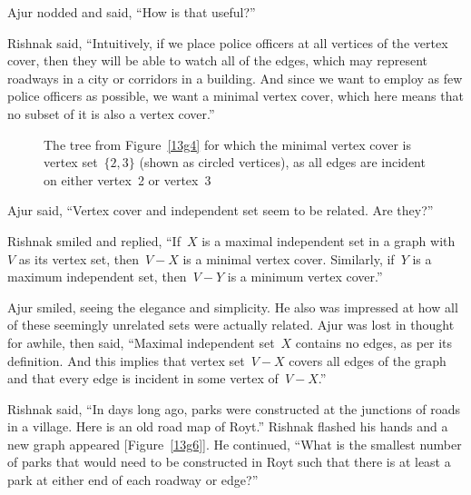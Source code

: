 Ajur nodded and said, ``How is that useful?''

Rishnak said, ``Intuitively, if we place police officers at all vertices of the vertex cover, then they will be able to watch all of the edges, which may represent roadways in a city or corridors in a building. And since we want to employ as few police officers as possible, we want a minimal vertex cover, which here means that no subset of it is also a vertex cover.''

\begin{figure}
\begin{center}

\caption{The tree from Figure~\ref{13g4} for which the minimal vertex cover is vertex set~$\{2,3\}$ (shown as circled vertices), as all edges are incident on either vertex~2 or vertex~3}\label{13g5}
\end{center}
\end{figure}

Ajur said, ``Vertex cover and independent set seem to be related. Are they?''

Rishnak smiled and replied, ``If~$X$ is a maximal independent set in a graph with~$V$ as its vertex set, then~$V-X$ is a minimal vertex cover. Similarly, if~$Y$ is a maximum independent set, then~$V-Y$ is a minimum vertex cover.''

Ajur smiled, seeing the elegance and simplicity. He also was impressed at how all of these seemingly unrelated sets were actually related. Ajur was lost in thought for awhile, then said, ``Maximal independent set~$X$ contains no edges, as per its definition. And this implies that vertex set~$V-X$ covers all edges of the graph and that every edge is incident in some vertex of~$V-X$.''

Rishnak said, ``In days long ago, parks were constructed at the junctions of roads in a village. Here is an old road map of Royt.'' Rishnak flashed his hands and a new graph appeared [Figure~\ref{13g6}]. He continued, ``What is the smallest number of parks that would need to be constructed in Royt such that there is at least a park at either end of each roadway or edge?''

